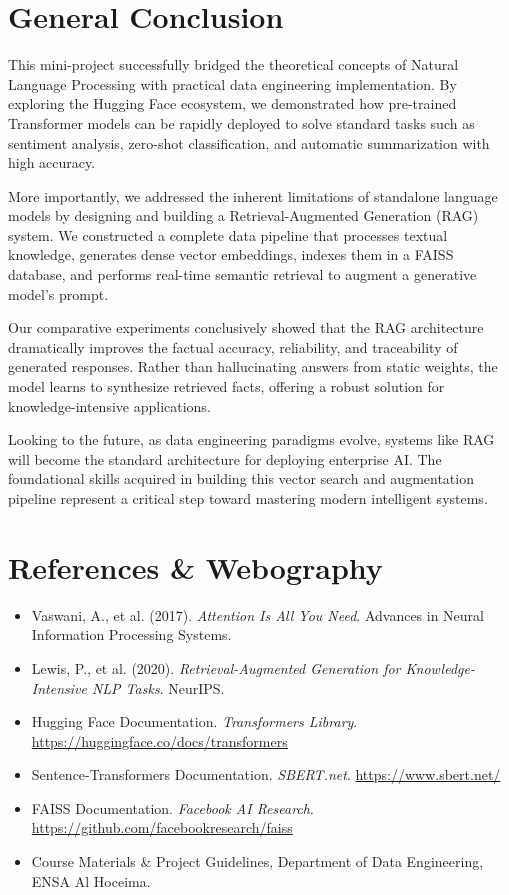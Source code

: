\documentclass[11pt,a4paper]{article}
\begin{document}
\section{General Conclusion}

This mini-project successfully bridged the theoretical concepts of Natural Language Processing with practical data engineering implementation. By exploring the Hugging Face ecosystem, we demonstrated how pre-trained Transformer models can be rapidly deployed to solve standard tasks such as sentiment analysis, zero-shot classification, and automatic summarization with high accuracy.

More importantly, we addressed the inherent limitations of standalone language models by designing and building a Retrieval-Augmented Generation (RAG) system. We constructed a complete data pipeline that processes textual knowledge, generates dense vector embeddings, indexes them in a FAISS database, and performs real-time semantic retrieval to augment a generative model's prompt. 

Our comparative experiments conclusively showed that the RAG architecture dramatically improves the factual accuracy, reliability, and traceability of generated responses. Rather than hallucinating answers from static weights, the model learns to synthesize retrieved facts, offering a robust solution for knowledge-intensive applications.

Looking to the future, as data engineering paradigms evolve, systems like RAG will become the standard architecture for deploying enterprise AI. The foundational skills acquired in building this vector search and augmentation pipeline represent a critical step toward mastering modern intelligent systems.

\vspace{1cm}
\section*{References \& Webography}
\begin{itemize}[label={--}]
    \item Vaswani, A., et al. (2017). \textit{Attention Is All You Need}. Advances in Neural Information Processing Systems.
    \item Lewis, P., et al. (2020). \textit{Retrieval-Augmented Generation for Knowledge-Intensive NLP Tasks}. NeurIPS.
    \item Hugging Face Documentation. \textit{Transformers Library}. \url{https://huggingface.co/docs/transformers}
    \item Sentence-Transformers Documentation. \textit{SBERT.net}. \url{https://www.sbert.net/}
    \item FAISS Documentation. \textit{Facebook AI Research}. \url{https://github.com/facebookresearch/faiss}
    \item Course Materials \& Project Guidelines, Department of Data Engineering, ENSA Al Hoceima.
\end{itemize}
\end{document}
